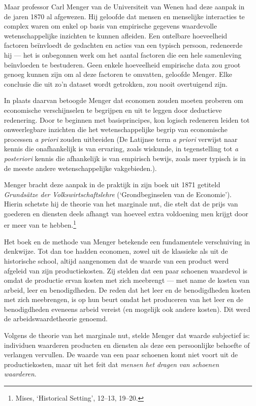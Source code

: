 \documentclass[
  a5paper,
  smalldemyvopaper,11pt,twoside,onecolumn,openright,extrafontsizes]{memoir}
\begin{document}
Maar professor Carl Menger van de Universiteit van Wenen had deze aanpak
in de jaren 1870 al afgewezen. Hij geloofde dat mensen en menselijke
interacties te complex waren om enkel op basis van empirische gegevens
waardevolle wetenschappelijke inzichten te kunnen afleiden. Een
ontelbare hoeveelheid factoren beïnvloedt de gedachten en acties van een
typisch persoon, redeneerde hij --- het is onbegonnen werk om het aantal
factoren die een hele samenleving beïnvloeden te bestuderen. Geen enkele
hoeveelheid empirische data zou groot genoeg kunnen zijn om al deze
factoren te omvatten, geloofde Menger. Elke conclusie die uit zo'n
dataset wordt getrokken, zou nooit overtuigend zijn.

In plaats daarvan betoogde Menger dat economen zouden moeten proberen om
economische verschijnselen te begrijpen en uit te leggen door deductieve
redenering. Door te beginnen met basisprincipes, kon logisch redeneren
leiden tot onweerlegbare inzichten die het wetenschappelijke begrip van
economische processen \emph{a priori} zouden uitbreiden (De Latijnse
term \emph{a priori} verwijst naar kennis die onafhankelijk is van
ervaring, zoals wiskunde, in tegenstelling tot \emph{a posteriori}
kennis die afhankelijk is van empirisch bewijs, zoals meer typisch is in
de meeste andere wetenschappelijke vakgebieden.).

Menger bracht deze aanpak in de praktijk in zijn boek uit 1871 getiteld
\emph{Grundsätze der Volkswirtschaftslehre} (`Grondbeginselen van de
Economie'). Hierin schetste hij de theorie van het marginale nut, die
stelt dat de prijs van goederen en diensten deels afhangt van hoeveel
extra voldoening men krijgt door er meer van te hebben.\footnote{\hspace{0pt}Mises,
  `Historical Setting', 12--13, 19--20.}

Het boek en de methode van Menger betekende een fundamentele
verschuiving in denkwijze. Tot dan toe hadden economen, zowel uit de
klassieke als uit de historische school, altijd aangenomen dat de waarde
van een product werd afgeleid van zijn productiekosten. Zij stelden dat
een paar schoenen waardevol is omdat de productie ervan kosten met zich
meebrengt --- met name de kosten van arbeid, leer en benodigdheden. De
reden dat het leer en de benodigdheden kosten met zich meebrengen, is op
hun beurt omdat het produceren van het leer en de benodigdheden eveneens
arbeid vereist (en mogelijk ook andere kosten). Dit werd de
arbeidswaardetheorie genoemd.

Volgens de theorie van het marginale nut, stelde Menger dat waarde
subjectief is: individuen waarderen producten en diensten als deze een
persoonlijke behoefte of verlangen vervullen. De waarde van een paar
schoenen komt niet voort uit de productiekosten, maar uit het feit dat
\emph{mensen het dragen van schoenen waarderen}.
\end{document}
